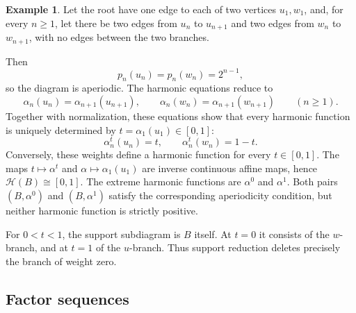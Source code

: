 \documentclass[11pt]{amsart}
\theoremstyle{definition}
\newtheorem{example}[theorem]{Example}
\theoremstyle{remark}
\begin{document}
\begin{example}\label{ex:positive-not-compact}
Let the root have one edge to each of two vertices $u_1,w_1$, and, for every
$n\geq1$, let there be two edges from $u_n$ to $u_{n+1}$ and two edges from
$w_n$ to $w_{n+1}$, with no edges between the two branches.
\begin{center}
\end{center}
Then
\[
  p_n(u_n)=p_n(w_n)=2^{n-1},
\]
so the diagram is aperiodic.
The harmonic equations reduce to
\[
 \alpha_n(u_n)=\alpha_{n+1}(u_{n+1}),\qquad
 \alpha_n(w_n)=\alpha_{n+1}(w_{n+1})
 \qquad(n\geq1).
\]
Together with normalization, these equations show that every harmonic
function is uniquely determined by $t=\alpha_1(u_1)\in[0,1]$:
\[
  \alpha_n^t(u_n)=t,
  \qquad
  \alpha_n^t(w_n)=1-t.
\]
Conversely, these weights define a harmonic function for every $t\in[0,1]$.
The maps $t\mapsto\alpha^t$ and $\alpha\mapsto\alpha_1(u_1)$ are inverse
continuous affine maps, hence $\mathcal H(B)\cong[0,1]$.
The extreme harmonic functions are $\alpha^0$ and $\alpha^1$.
Both pairs $(B,\alpha^0)$ and $(B,\alpha^1)$ satisfy the corresponding
aperiodicity condition, but neither harmonic function is strictly positive.

For $0<t<1$, the support subdiagram is $B$ itself.  At $t=0$ it
consists of the $w$-branch, and at $t=1$ of the $u$-branch.
Thus support reduction deletes precisely the branch of weight zero.
\end{example}

\subsection{Factor sequences}
\label{subsec:factor-sequence-models}
\end{document}
